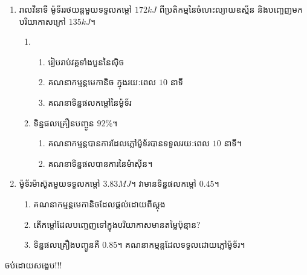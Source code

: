 \begin{example}
	\begin{enumerate}
		\item រាលវិនាទី ម៉ូទ័ររថយន្តមួយទទួលកម្តៅ $172kJ$ ពីប្រតិកម្មនៃចំហេះល្យាយឧស្ម័ន និងបញ្ចេញមកបរិយាកាសក្រៅ $135kJ$។
		\begin{enumerate}[1]
			\item \begin{enumerate}[k]
				\item រៀបរាប់វគ្គទាំងបួននៃសុិច
				\item គណនាកម្មន្តមេកានិច ក្នុងរយៈពេល $10$ នាទី
				\item គណនាទិន្នផលកម្តៅនៃម៉ូទ័រ
			\end{enumerate}
			\item ទិន្នផលគ្រឿនបញ្ចូន $92\%$។
			\begin{enumerate}[k]
				\item គណនាកម្មន្តបានការដែលភ្លៅម៉ូទ័របានទទួលរយៈពេល $10$ នាទី។
				\item គណនាទិន្នផលបានការនៃម៉ាសុីន។
			\end{enumerate}
		\end{enumerate}
		\item ម៉ូទ័រម៉ាស៊ូតមួយទទួលកម្តៅ $3.83MJ$។ វាមានទិន្នផលកម្តៅ $0.45$។
		\begin{enumerate}
			\item គណនាកម្មន្តមេកានិចដែលផ្តល់ដោយពីស្តុង
			\item តើកម្តៅដែលបញ្ចេញទៅក្នុងបរិយាកាសមានតម្លៃប៉ុន្មាន?
			\item ទិន្នផលគ្រឿងបញ្ចូនគឺ $0.85$។ គណនាកម្មន្តដែលទទួលដោយភ្លៅម៉ូទ័រ។
		\end{enumerate}
	\end{enumerate}
\end{example}
\begin{center}
	{\Large \kml\color{magenta} ចប់ដោយសង្ខេប!!!}
\end{center}